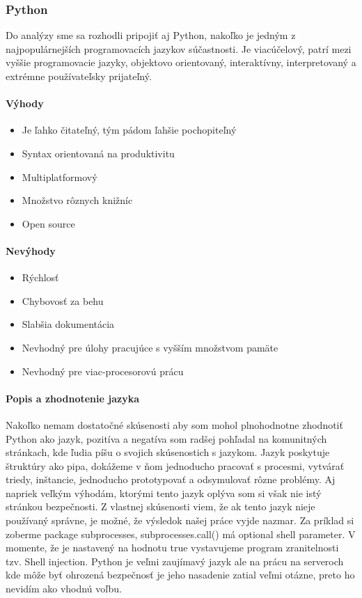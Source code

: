 \subsubsection{Python}
Do analýzy sme sa rozhodli pripojiť aj Python, nakoľko je jedným z najpopulárnejších programovacích jazykov súčastnosti. Je viacúčelový, patrí mezi vyššie programovacie jazyky, objektovo orientovaný, interaktívny, interpretovaný a extrémne používateľsky prijateľný.
\paragraph{Výhody}
\begin{itemize}
	\item Je ľahko čitateľný, tým pádom ľahšie pochopiteľný
	\item Syntax orientovaná na produktivitu
	\item Multiplatformový
	\item Množstvo rôznych knižníc
	\item Open source
	\newline
\end{itemize}
\paragraph{Nevýhody}
\begin{itemize}
	\item Rýchlosť
	\item Chybovosť za behu
	\item Slabšia dokumentácia
	\item Nevhodný pre úlohy pracujúce s vyšším množstvom pamäte
	\item Nevhodný pre viac-procesorovú prácu
	\newline
\end{itemize}

\paragraph{Popis a zhodnotenie jazyka}
Nakoľko nemam dostatočné skúsenosti aby som mohol plnohodnotne zhodnotiť Python ako jazyk, pozitíva a negatíva som radšej pohľadal na komunitných stránkach, kde ľudia píšu o svojich skúsenostich s jazykom. Jazyk poskytuje štruktúry ako pipa, dokážeme v ňom jednoducho pracovať s procesmi, vytvárať triedy, inštancie, jednoducho prototypovať a odsymulovať rôzne problémy. Aj napriek veľkým výhodám, ktorými tento jazyk oplýva som si však nie istý stránkou bezpečnosti. Z vlastnej skúsenosti viem, že ak tento jazyk nieje používaný správne, je možné, že výsledok našej práce vyjde nazmar. Za príklad si zoberme  package subprocesses, subprocesses.call() má optional shell parameter. V momente, že je nastavený na hodnotu true vystavujeme program zranitelnosti tzv. Shell injection. Python je veľmi zaujímavý jazyk ale na prácu na serveroch kde môže byť ohrozená bezpečnosť je jeho nasadenie zatial veľmi otázne, preto ho nevidím ako vhodnú voľbu.

